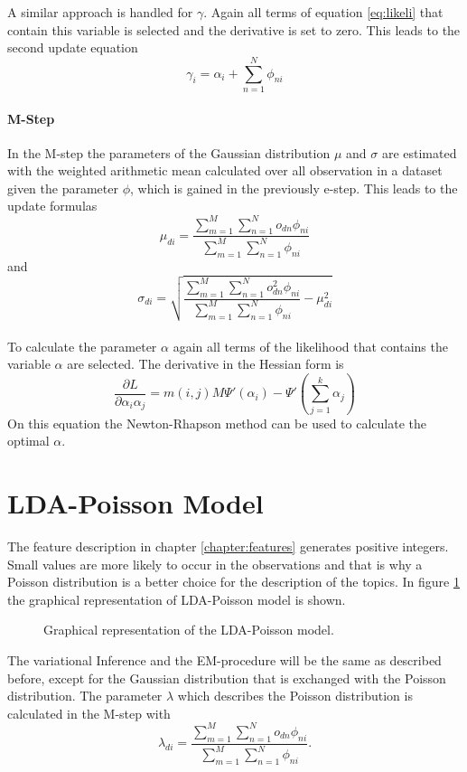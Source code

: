 A similar approach is handled for $\gamma$. Again all terms of equation \ref{eq:likeli} that contain this variable is selected and the derivative is set to zero. This leads to the second update equation
\begin{equation}
 \gamma_i = \alpha_i + \sum_{n=1}^N \phi_{ni}
\end{equation}


\paragraph{M-Step}
  
In the M-step the parameters of the Gaussian distribution $\mu$ and $\sigma$ are estimated with the weighted arithmetic mean calculated over all observation in a dataset given the parameter $\phi$, which is gained in the previously e-step. This leads to the update formulas
\begin{equation}
 \mu_{di} = \frac{\sum_{m=1}^M \sum_{n=1}^N o_{dn} \phi_{ni} }{\sum_{m=1}^M \sum_{n=1}^N  \phi_{ni}}
\end{equation}
and
\begin{equation}
 \sigma_{di} = \sqrt{\frac{\sum_{m=1}^M \sum_{n=1}^N o_{dn}^2 \phi_{ni} }{\sum_{m=1}^M \sum_{n=1}^N  \phi_{ni}} - \mu_{di}^2}
\end{equation}\\

To calculate the parameter $\alpha$ again all terms of the likelihood that contains the variable $\alpha$ are selected. The derivative in the Hessian form is
\begin{equation}
 \frac{\partial L}{\partial \alpha_i\alpha_j} =  m(i,j) M \Psi'(\alpha_i) - \Psi'(\sum_{j=1}^k \alpha_j)
\end{equation}
On this equation the Newton-Rhapson method can be used to calculate the optimal $\alpha$.

\section{LDA-Poisson Model}

The feature description in chapter \ref{chapter:features} generates positive integers. Small values are more likely to occur in the observations and that is why a Poisson distribution is a better choice for the description of the topics. In figure \ref{fig:LDAPoisson} the graphical representation of LDA-Poisson model is shown. 

\begin{figure}[h!]
\centering
\def\svgwidth{0.8\textwidth}

\caption{Graphical representation of the LDA-Poisson model.}
\label{fig:LDAPoisson}
\end{figure}

The variational Inference and the EM-procedure will be the same as described before, except for the Gaussian distribution that is exchanged with the Poisson distribution. The parameter $\lambda$ which describes the Poisson distribution is calculated in the M-step with
\begin{equation}
 \lambda_{di} = \frac{\sum_{m=1}^M \sum_{n=1}^N o_{dn} \phi_{ni} }{\sum_{m=1}^M \sum_{n=1}^N  \phi_{ni}}.
\end{equation}

